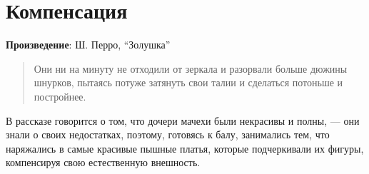 \section{Компенсация}

\textbf{Произведение}: Ш. Перро, “Золушка”

\begin{quote}
    Они ни на минуту не отходили от зеркала и 
    разорвали больше дюжины шнурков, 
    пытаясь потуже затянуть свои талии и 
    сделаться потоньше и постройнее.
\end{quote}

В рассказе говорится о том, что дочери мачехи были некрасивы
и полны, 
--- они знали о своих недостатках, 
поэтому, готовясь к балу, 
занимались тем, что наряжались в самые красивые пышные платья, 
которые подчеркивали их фигуры, компенсируя
свою естественную внешность.
